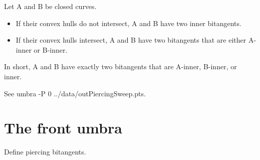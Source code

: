 \documentclass[12pt]{article}
\newif\ifCommentary             %
\begin{document}
\clearpage

\begin{lemma}
Let A and B be closed curves.
\begin{itemize}
\item If their convex hulls do not intersect,
A and B have two inner bitangents. %
\item If their convex hulls intersect,
A and B have two bitangents that are either A-inner or B-inner.
\end{itemize}
In short, A and B have exactly two bitangents that are A-inner, B-inner, or inner.
\end{lemma}
\prf
See umbra -P 0 ../data/outPiercingSweep.pts.
\QED

\clearpage

\ifCommentary
\begin{figure}
\begin{center}
\texttt{[image: img2/umbra1outer.jpg]}
\texttt{[image: img2/umbra1late.jpg]}
\end{center}
\caption{(a) The two outer bitangents of A and L. (b) The late segment of a bitangent.}
\label{fig:outer}
\end{figure}

\begin{figure}
\begin{center}
\texttt{[image: img2/umbra1piercing.jpg]}
\texttt{[image: img2/umbra1outerpiercing.jpg]}
\texttt{[image: img2/umbra1interm.jpg]}
\end{center}
\caption{(a) The piercing bitangents of A and L.
         (b) The outer piercing bitangents. 
         (c) The bridge segment of a piercing bitangent.}
\label{fig:piercing}
\end{figure}
\fi

\section{The front umbra}

Define piercing bitangents.


\end{document}
